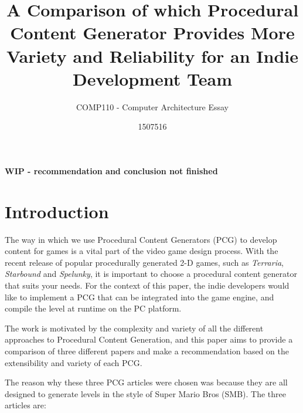 \documentclass{scrartcl}
\title{A Comparison of which Procedural Content Generator Provides More Variety and Reliability for an Indie Development Team}
\subtitle{COMP110 - Computer Architecture Essay}
\author{1507516}
\begin{document}
\maketitle

\begin{center}
\textbf{WIP - recommendation and conclusion not finished}

\end{center}




\section{Introduction}

The way in which we use Procedural Content Generators (PCG) to develop content for games is a vital part of the video game design process. With the recent release of popular procedurally generated 2-D games, such as \textit{Terraria}, \textit{Starbound} and \textit{Spelunky}, it is important to choose a procedural content generator that suits your needs. For the context of this paper, the indie developers would like to implement a PCG that can be integrated into the game engine, and compile the level at runtime on the PC platform.

The work is motivated by the complexity and variety of all the different approaches to Procedural Content Generation, and this paper aims to provide a comparison of three different papers and make a recommendation based on the extensibility and variety of each PCG. 

The reason why these three PCG articles were chosen was because they are all designed to generate levels in the style of Super Mario Bros (SMB).
The three articles are:
\end{document}
